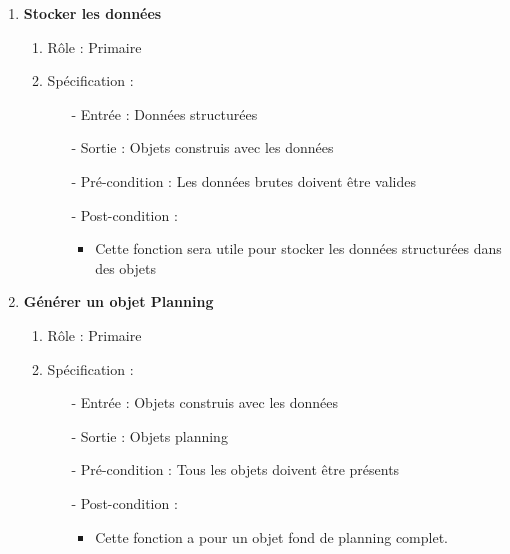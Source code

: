 \documentclass{polytech/polytech}
\begin{document}
\begin{enumerate}
		\item \textbf{Stocker les données}
		\begin{enumerate}
			\item Rôle :  Primaire
			\item Spécification :
			\begin{itemize}
				\item[-] Entrée : Données structurées
				\item[-] Sortie : Objets construis avec les données
				\item[-] Pré-condition : Les données brutes doivent être valides
				\item[-] Post-condition :
				\begin{itemize}[label=\textbullet, font=\LARGE]
					\item Cette fonction sera utile pour stocker les données structurées dans des objets
				\end{itemize}
			\end{itemize}
		\end{enumerate}

		\item \textbf{Générer un objet Planning}
		\begin{enumerate}
			\item Rôle :  Primaire
			\item Spécification :
			\begin{itemize}
				\item[-] Entrée : Objets construis avec les données
				\item[-] Sortie : Objets planning
				\item[-] Pré-condition : Tous les objets doivent être présents
				\item[-] Post-condition :
				\begin{itemize}[label=\textbullet, font=\LARGE]
					\item Cette fonction a pour un objet fond de planning complet.
				\end{itemize}
			\end{itemize}
		\end{enumerate}


\end{enumerate}
\end{document}
